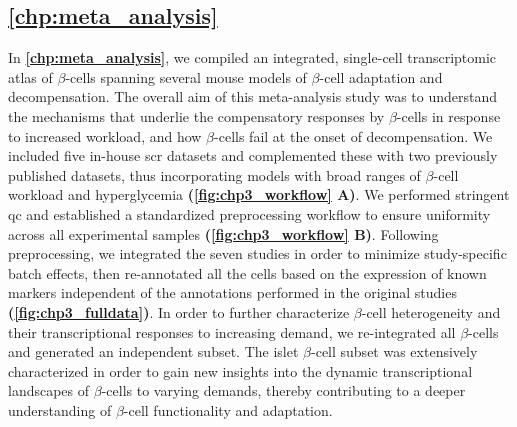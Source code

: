 
\subsection{\autoref{chp:meta_analysis}}

\par In \textbf{\autoref{chp:meta_analysis}}, we compiled an integrated, single-cell transcriptomic atlas of $\beta$-cells spanning several mouse models of $\beta$-cell adaptation and decompensation. The overall aim of this meta-analysis study was to understand the mechanisms that underlie the compensatory responses by $\beta$-cells in response to increased workload, and how $\beta$-cells fail at the onset of decompensation. We included five in-house \gls{scr} datasets and complemented these with two previously published datasets, thus incorporating models with broad ranges of $\beta$-cell workload and hyperglycemia \textbf{(\autoref{fig:chp3_workflow} A)}. We performed stringent \gls{qc} and established a standardized preprocessing workflow to ensure uniformity across all experimental samples \textbf{(\autoref{fig:chp3_workflow} B)}. Following preprocessing, we integrated the seven studies in order to minimize study-specific batch effects, then re-annotated all the cells based on the expression of known markers independent of the annotations performed in the original studies \textbf{(\autoref{fig:chp3_fulldata})}. In order to further characterize $\beta$-cell heterogeneity and their transcriptional responses to increasing demand, we re-integrated all $\beta$-cells and generated an independent subset. The islet $\beta$-cell subset was extensively characterized in order to gain new insights into the dynamic transcriptional landscapes of $\beta$-cells to varying demands, thereby contributing to a deeper understanding of  $\beta$-cell functionality and adaptation.


